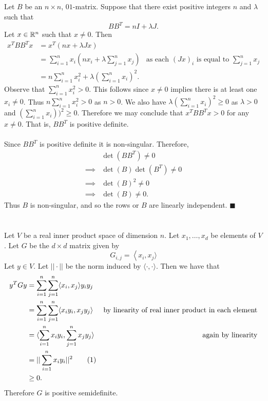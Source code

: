 \documentclass[letterpaper,12pt,oneside,onecolumn]{article}
\newcommand\numberthis{\addtocounter{equation}{1}\tag{\theequation}}
\begin{document}
\subsection{}
\paragraph{}
Let $B$ be an $n \times n$, $01$-matrix. Suppose that there exist positive integers $n$ and $\lambda$ such that
$$BB^T = nI + \lambda J.$$
Let $x \in \mathbb{R}^n$ such that $x\neq 0$. Then 
\begin{align*}
x^T BB^T x &= x^T(nx + \lambda Jx) \\
&=\sum_{i=1}^n x_i(nx_i + \lambda \sum_{j=1}^n x_j) &\text{as each $(Jx)_i$ is equal to $\sum_{j=1}^n x_j$} \\
&= n\sum_{i=1}^n x_i^2 + \lambda (\sum_{i=1}^n x_i)^2.
\end{align*}
Observe that $\sum_{i=1}^n x_i^2 > 0$. This follows since $x \neq 0$ implies there is at least one $x_i \neq 0$. Thus $n \sum_{i=1}^n x_i^2 >0$ as $n >0$. We also have $\lambda (\sum_{i=1}^n x_i)^2 \geq 0$ as $\lambda >0$ and $(\sum_{i=1}^n x_i))^2 \geq 0$. Therefore we may conclude that $x^TBB^Tx >0$ for any $x \neq 0$. That is, $BB^T$ is positive definite.
\paragraph{}
Since $BB^T$ is positive definite it is non-singular. Therefore,
\begin{align*}
&\det(BB^T) \neq 0 \\
\implies &\det(B)\det(B^T) \neq 0 \\
\implies &\det(B)^2 \neq 0 \\
\implies &\det(B) \neq 0. 
\end{align*}
Thus $B$ is non-singular, and so the rows or $B$ are linearly independent. $\blacksquare$

\section{}
\paragraph{}
Let $V$ be a real inner product space of dimension $n$. Let $x_1, \dots, x_d$ be elements of $V$. Let $G$ be the $d \times d$ matrix given by $$ G_{i,j} = \left \langle x_i, x_j \rangle \right.$$ Let $y \in V$. Let $||\cdot ||$ be the norm induced by $\langle \cdot,\cdot \rangle$. Then we have that
\begin{align*}
y^TGy &= \sum_{i=1}^n\sum_{j=1}^n \langle x_i,x_j \rangle y_i y_j \\
&= \sum_{i=1}^n \sum_{j = 1}^n  \langle x_i y_i, x_j y_j \rangle  &\text{by linearity of real inner product in each element} \\
&= \langle \sum_{i=1}^n x_i y_i, \sum_{j=1}^n x_j y_j \rangle &\text{again by linearity} \\
&= ||\sum_{i=1}^n x_i y_i ||^2 \numberthis\label{eq:norm}\\
&\geq 0.
\end{align*}
Therefore $G$ is positive semidefinite.
\end{document}
